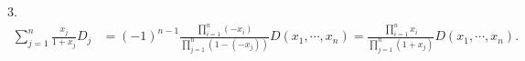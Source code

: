 3. 
\[\begin{aligned}
    \sum_{j=1}^{n}\frac{x_j}{1+x_j}D_j
    & =(-1)^{n-1} \frac{\prod_{i=1}^n\left(-x_i\right)}{\prod_{j=1}^n\left(1-\left(-x_j\right)\right)} D\left(x_1, \cdots, x_n\right)=\frac{\prod_{i=1}^n x_i}{\prod_{j=1}^n\left(1+x_j\right)} D\left(x_1, \cdots, x_n\right) . \\
    &
    \end{aligned}\]





























